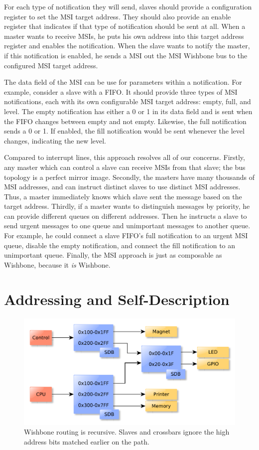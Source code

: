 \documentclass[a4paper]{jacow}
\begin{document}
For each type of notification they will send,
slaves should provide a configuration register to set the MSI target address.
They should also provide an enable register that indicates if that type of
notification should be sent at all.
When a master wants to receive MSIs, he puts his own address into this
target address register and enables the notification.
When the slave wants to notify the master, if this notification is enabled,
he sends a MSI out the MSI Wishbone bus to the configured MSI target address.

The data field of the MSI can be use for parameters within a notification.
For example, consider a slave with a FIFO.
It should provide three types of MSI notifications, each with its own
configurable MSI target address: empty, full, and level.
The empty notification has either a 0 or 1 in its data field and is sent
when the FIFO changes between empty and not empty.
Likewise, the full notification sends a 0 or 1.
If enabled, the fill notification would be sent whenever the level
changes, indicating the new level.

Compared to interrupt lines, this approach resolves all of our concerns.
Firstly, any master which can control a slave can receive MSIs from that slave;
the bus topology is a perfect mirror image.
Secondly, the masters have many thousands of MSI addresses, and can
instruct distinct slaves to use distinct MSI addresses.
Thus, a master immediately knows which slave sent the message based on the target address.
Thirdly, if a master wants to distinguish messages by priority, 
he can provide different queues on different addresses.
Then he instructs a slave to send urgent messages to one queue and
unimportant messages to another queue.
For example, he could connect a slave FIFO's full notification to an urgent MSI queue,
disable the empty notification, and connect the fill notification to an
unimportant queue.
Finally, the MSI approach is just as composable as Wishbone,
because it \emph{is} Wishbone.

\section{Addressing and Self-Description}

\begin{figure}[t]
  \centering
  \includegraphics*[width=\columnwidth]{addressing}
  \caption{Wishbone routing is recursive. Slaves and crossbars
  ignore the high address bits matched earlier on the path.}
  \label{fig:addressing}
\end{figure}
\end{document}
